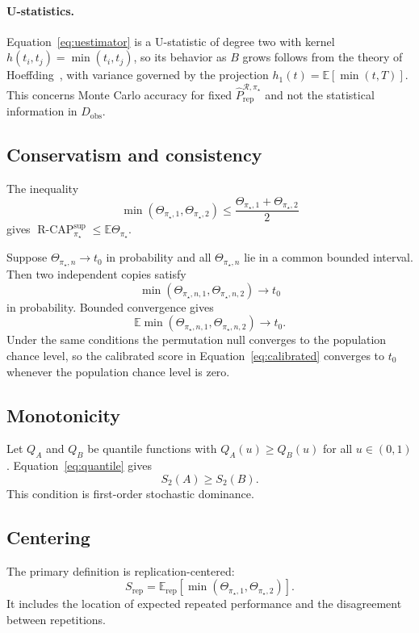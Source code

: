 \documentclass[11pt]{article}
\newcommand{\Regime}{\mathcal{R}}
\newcommand{\E}{\mathbb{E}}
\newcommand{\RCAP}{\operatorname{R\text{-}CAP}^{\mathrm{sup}}_{\pi_\star}}
\newcommand{\PRepHat}{\widehat{P}_{\mathrm{rep}}^{\Regime,\pi_\star}}
\theoremstyle{remark}
\begin{document}
\paragraph{U-statistics.}
Equation~\eqref{eq:uestimator} is a U-statistic of degree two with kernel $h(t_i,t_j)=\min(t_i,t_j)$, so its behavior as $B$ grows follows from the theory of Hoeffding~\cite{hoeffding1948ustat}, with variance governed by the projection $h_1(t)=\E[\min(t,T)]$. This concerns Monte Carlo accuracy for fixed $\PRepHat$ and not the statistical information in $D_{\mathrm{obs}}$.

\subsection{Conservatism and consistency}

The inequality
\[
\min(\Theta_{\pi_\star,1},\Theta_{\pi_\star,2})
\leq
\frac{\Theta_{\pi_\star,1}+\Theta_{\pi_\star,2}}{2}
\]
gives $\RCAP\leq\E\Theta_{\pi_\star}$.

Suppose $\Theta_{\pi_\star,n}\to t_0$ in probability and all $\Theta_{\pi_\star,n}$ lie in a common bounded interval. Then two independent copies satisfy
\[
\min(\Theta_{\pi_\star,n,1},\Theta_{\pi_\star,n,2})\to t_0
\]
in probability. Bounded convergence gives
\[
\E\min(\Theta_{\pi_\star,n,1},\Theta_{\pi_\star,n,2})\to t_0.
\]
Under the same conditions the permutation null converges to the population chance level, so the calibrated score in Equation~\eqref{eq:calibrated} converges to $t_0$ whenever the population chance level is zero.

\subsection{Monotonicity}

Let $Q_A$ and $Q_B$ be quantile functions with $Q_A(u)\geq Q_B(u)$ for all $u\in(0,1)$. Equation~\eqref{eq:quantile} gives
\[
S_2(A)\geq S_2(B).
\]
This condition is first-order stochastic dominance.

\subsection{Centering}
\label{app:centering}

The primary definition is replication-centered:
\[
S_{\mathrm{rep}}
=
\E_{\mathrm{rep}}
\left[
\min(\Theta_{\pi_\star,1},\Theta_{\pi_\star,2})
\right].
\]
It includes the location of expected repeated performance and the disagreement between repetitions.
\end{document}

